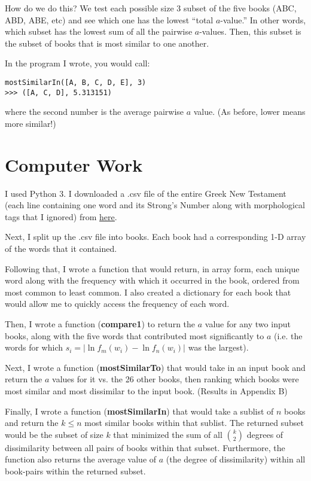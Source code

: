 \documentclass[12pt,letterpaper]{article}
\begin{document}
How do we do this?  We test each possible size 3 subset of the five books (ABC, ABD, ABE, etc) and see which one has the lowest ``total $a$-value.''  In other words, which subset has the lowest sum of all the pairwise $a$-values.  Then, this subset is the subset of books that is most similar to one another.

In the program I wrote, you would call:
\begin{verbatim}
mostSimilarIn([A, B, C, D, E], 3)
>>> ([A, C, D], 5.313151)
\end{verbatim}
where the second number is the average pairwise $a$ value.  (As before, lower means more similar!)

\section{Computer Work}
I used Python 3.  I downloaded a .csv file of the entire Greek New Testament (each line containing one word and its Strong's Number along with morphological tags that I ignored) from \underline{\href{https://github.com/biblicalhumanities/Nestle1904/tree/master/morph}{here}}.  

Next, I split up the .csv file into books.  Each book had a corresponding 1-D array of the words that it contained.  

Following that, I wrote a function that would return, in array form, each unique word along with the frequency with which it occurred in the book, ordered from most common to least common.  I also created a dictionary for each book that would allow me to quickly access the frequency of each word.

Then, I wrote a function (\textbf{compare1}) to return the $a$ value for any two input books, along with the five words that contributed most significantly to $a$ (i.e. the words for which $s_i = |\ln f_m(w_i) - \ln f_n(w_i)|$ was the largest).  

Next, I wrote a function (\textbf{mostSimilarTo}) that would take in an input book and return the $a$ values for it vs. the 26 other books, then ranking which books were most similar and most dissimilar to the input book. (Results in Appendix B)

Finally, I wrote a function (\textbf{mostSimilarIn}) that would take a sublist of $n$ books and return the $k\leq n$ most similar books within that sublist.  The returned subset would be the subset of size $k$ that minimized the sum of all $\binom{k}{2}$ degrees of dissimilarity between all pairs of books within that subset.  Furthermore, the function also returns the average value of $a$ (the degree of dissimilarity) within all book-pairs within the returned subset.  
\end{document}
